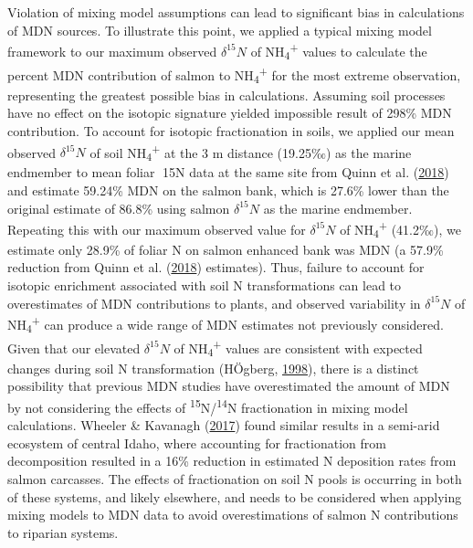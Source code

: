 \documentclass [11pt, proquest] {uwthesis}[2015/03/03]
\begin{document}
Violation of mixing model assumptions can lead to significant bias in
calculations of MDN sources. To illustrate this point, we applied a
typical mixing model framework to our maximum observed \(\delta^{15}N\)
of NH\textsubscript{4}\textsuperscript{+} values to calculate the
percent MDN contribution of salmon to
NH\textsubscript{4}\textsuperscript{+} for the most extreme observation,
representing the greatest possible bias in calculations. Assuming soil
processes have no effect on the isotopic signature yielded impossible
result of 298\% MDN contribution. To account for isotopic fractionation
in soils, we applied our mean observed \(\delta^{15}N\) of soil
NH\textsubscript{4}\textsuperscript{+} at the 3 m distance (19.25‰) as
the marine endmember to mean foliar 15N data at the same site from
Quinn et al. (\protect\hyperlink{ref-Quinn2018}{2018}) and estimate
59.24\% MDN on the salmon bank, which is 27.6\% lower than the original
estimate of 86.8\% using salmon \(\delta^{15}N\) as the marine
endmember. Repeating this with our maximum observed value for
\(\delta^{15}N\) of NH\textsubscript{4}\textsuperscript{+} (41.2‰), we
estimate only 28.9\% of foliar N on salmon enhanced bank was MDN (a
57.9\% reduction from Quinn et al.
(\protect\hyperlink{ref-Quinn2018}{2018}) estimates). Thus, failure to
account for isotopic enrichment associated with soil N transformations
can lead to overestimates of MDN contributions to plants, and observed
variability in \(\delta^{15}N\) of
NH\textsubscript{4}\textsuperscript{+} can produce a wide range of MDN
estimates not previously considered. Given that our elevated
\(\delta^{15}N\) of NH\textsubscript{4}\textsuperscript{+} values are
consistent with expected changes during soil N transformation (HÖgberg,
\protect\hyperlink{ref-Hogberg1998}{1998}), there is a distinct
possibility that previous MDN studies have overestimated the amount of
MDN by not considering the effects of
\textsuperscript{15}N/\textsuperscript{14}N fractionation in mixing
model calculations. Wheeler \& Kavanagh
(\protect\hyperlink{ref-Wheeler2017}{2017}) found similar results in a
semi-arid ecosystem of central Idaho, where accounting for fractionation
from decomposition resulted in a 16\% reduction in estimated N
deposition rates from salmon carcasses. The effects of fractionation on
soil N pools is occurring in both of these systems, and likely
elsewhere, and needs to be considered when applying mixing models to MDN
data to avoid overestimations of salmon N contributions to riparian
systems.
\end{document}
